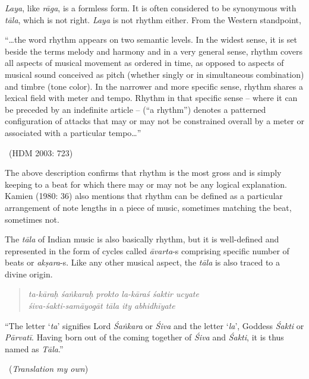 \textit{Laya}, like \textit{rāga}, is a formless form. It is often considered to be synonymous with \textit{tāla}, which is not right. \textit{Laya} is not rhythm either. From the Western standpoint,

\begin{myquote}
“…the word rhythm appears on two semantic levels. In the widest sense, it is set beside the terms melody and harmony and in a very general sense, rhythm covers all aspects of musical movement as ordered in time, as opposed to aspects of musical sound conceived as pitch (whether singly or in simultaneous combination) and timbre (tone color). In the narrower and more specific sense, rhythm shares a lexical field with meter and tempo. Rhythm in that specific sense – where it can be preceded by an indefinite article – (“a rhythm”) denotes a patterned configuration of attacks that may or may not be constrained overall by a meter or associated with a particular tempo…” 

~\hfill (HDM 2003: 723)
\end{myquote}

The above description confirms that rhythm is the most gross and is simply keeping to a beat for which there may or may not be any logical explanation. Kamien (1980: 36) also mentions that rhythm can be defined as a particular arrangement of note lengths in a piece of music, sometimes matching the beat, sometimes not.

The \textit{tāla} of Indian music is also basically rhythm, but it is well-defined and represented in the form of cycles called \textit{āvarta}-s comprising specific number of beats or \textit{akṣara}-s. Like any other musical aspect, the \textit{tāla} is also traced to a divine origin.

\begin{verse}
\textit{ta-kāraḥ śaṅkaraḥ prokto la-kāraś śaktir ucyate }\\ \textit{śiva-śakti-samāyogāt tāla ity abhidhīyate }
\end{verse}

\begin{myquote}
“The letter ‘\textit{ta}’ signifies Lord \textit{Śaṅkara} or \textit{Śiva} and the letter ‘\textit{la}’, Goddess \textit{Śakti} or \textit{Pārvatī}. Having born out of the coming together of \textit{Śiva} and \textit{Śakti}, it is thus named as \textit{Tāla}.” 

~\hfill (\textit{Translation my own})
\end{myquote}

